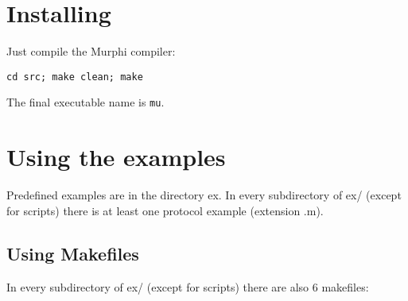 \documentclass{article}
\begin{document}
\section{Installing}

Just compile the Murphi compiler:

{\tt cd src; make clean; make}

The final executable name is {\tt mu}.

\section{Using the examples}

Predefined examples are in the directory ex. In every subdirectory of ex/
(except for scripts) there is at least one protocol example (extension .m).

\subsection{Using Makefiles}

In every subdirectory of ex/ (except for scripts) there are also 6 makefiles:
\end{document}
